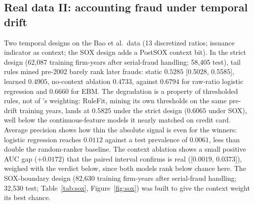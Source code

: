 \subsection{Real data II: accounting fraud under temporal drift}

Two temporal designs on the Bao et al.\ data (13 discretized ratios;
issuance indicator as context; the SOX design adds a PostSOX context
bit). In the strict design (62{,}087 training firm-years after
serial-fraud handling; 58{,}405 test), tail rules mined pre-2002 barely
rank later frauds: \pla{} static $0.5285$ [0.5028, 0.5585], learned $0.4905$,
no-context ablation $0.4733$, against $0.6794$ for raw-ratio logistic
regression and $0.6660$ for EBM. The degradation is a property of
thresholded rules, not of \pla{}'s weighting: RuleFit, mining its own
thresholds on the same pre-drift training years, lands at $0.5825$
under the strict design ($0.6065$ under SOX), well below the
continuous-feature models it nearly matched on credit card. Average
precision shows how thin the
absolute signal is even for the winners: logistic regression reaches
$0.0112$ against a test prevalence of $0.0061$, less than double the
random-ranker baseline. The context ablation shows a small positive AUC
gap ($+0.0172$) that the paired interval confirms is real
([$0.0019$, $0.0373$]), weighed with the verdict below, since both
models rank below chance here. The SOX-boundary
design (82{,}630 training firm-years after serial-fraud handling;
32{,}530 test; Table~\ref{tab:sox}, Figure~\ref{fig:sox}) was built to
give the context weight its best chance.

